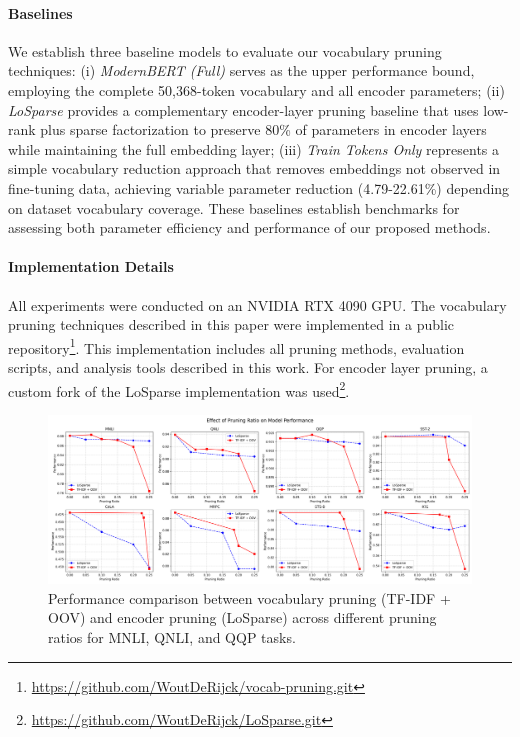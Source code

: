 \documentclass[twocolumn]{article}
\begin{document}
\paragraph{Baselines} 
We establish three baseline models to evaluate our vocabulary pruning techniques: 
(i) \textit{ModernBERT (Full)} serves as the upper performance bound, employing the complete 50,368-token vocabulary and all encoder parameters; 
(ii) \textit{LoSparse} provides a complementary encoder-layer pruning baseline that uses low-rank plus sparse factorization to preserve 80\% of parameters in encoder layers while maintaining the full embedding layer; 
(iii) \textit{Train Tokens Only} represents a simple vocabulary reduction approach that removes embeddings not observed in fine-tuning data, achieving variable parameter reduction (4.79-22.61\%) depending on dataset vocabulary coverage. 
These baselines establish benchmarks for assessing both parameter efficiency and performance of our proposed methods.


\paragraph{Implementation Details}
All experiments were conducted on an NVIDIA RTX 4090 GPU. The vocabulary pruning techniques described in this paper were implemented in a public repository\footnote{\url{https://github.com/WoutDeRijck/vocab-pruning.git}}. This implementation includes all pruning methods, evaluation scripts, and analysis tools described in this work. For encoder layer pruning, a custom fork of the LoSparse implementation was used\footnote{\url{https://github.com/WoutDeRijck/LoSparse.git}}.

\begin{figure}[t]
    \centering
    \includegraphics[width=\linewidth]{images/pruning_ratios.png}
    \caption{Performance comparison between vocabulary pruning (TF-IDF + OOV) and encoder pruning (LoSparse) across different pruning ratios for MNLI, QNLI, and QQP tasks. }
    \label{fig:pruning_ratio}
\end{figure}
\end{document}
